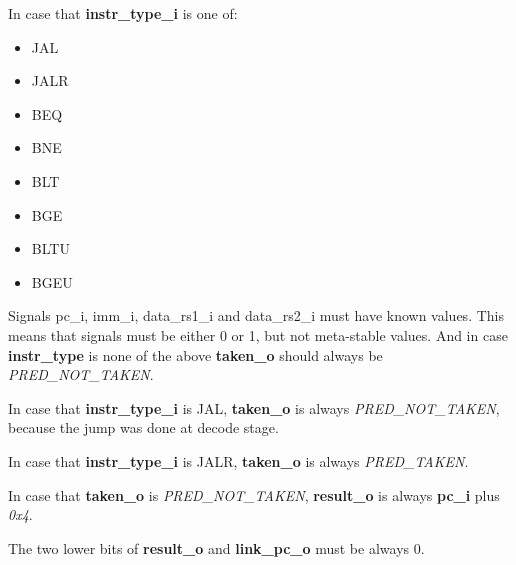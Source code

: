 In case that \textbf{instr\_type\_i} is one of:
\begin{itemize}
  \item JAL
  \item JALR
  \item BEQ
  \item BNE
  \item BLT
  \item BGE
  \item BLTU
  \item BGEU
\end{itemize}

Signals pc\_i, imm\_i, data\_rs1\_i and data\_rs2\_i must have known values. This means that signals must be either 0 or 1, but not meta-stable values. And in case \textbf{instr\_type} is none of the above \textbf{taken\_o} should always be \emph{PRED\_NOT\_TAKEN}.

In case that \textbf{instr\_type\_i} is JAL, \textbf{taken\_o} is always \emph{PRED\_NOT\_TAKEN}, because the jump was done at decode stage.

In case that \textbf{instr\_type\_i} is JALR, \textbf{taken\_o} is always \emph{PRED\_TAKEN}.

In case that \textbf{taken\_o} is \emph{PRED\_NOT\_TAKEN}, \textbf{result\_o} is always \textbf{pc\_i} plus \emph{0x4}.

The two lower bits of \textbf{result\_o} and \textbf{link\_pc\_o} must be always 0. 
    